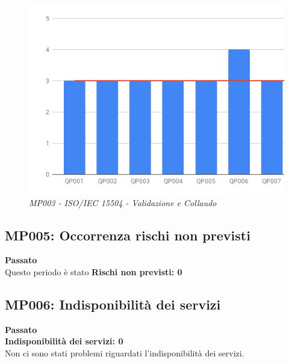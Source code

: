 \begin{figure}[H]
    \centering
	\includegraphics[scale=0.7]{./images/RA_spice.png}
    \caption{\textit{MP003 - ISO/IEC 15504 - Validazione e Collaudo}}
\end{figure}

\subsection{MP005:  Occorrenza rischi non previsti}
\textbf{Passato}\\
Questo periodo è stato 
\textbf{Rischi non previsti: 0}

\subsection{MP006: Indisponibilità dei servizi}
\textbf{Passato}\\
\textbf{Indisponibilità dei servizi: 0}\\
Non ci sono stati problemi riguardati l'indisponibilità dei servizi.

